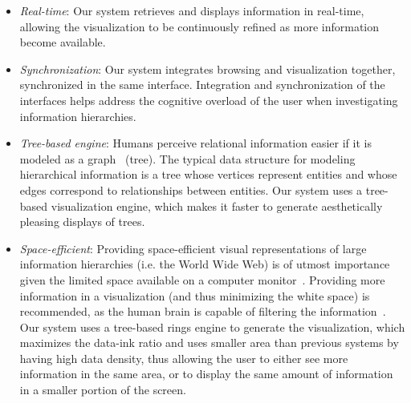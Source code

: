 \documentclass[]{article}
\begin{document}
\begin{itemize}

\item {\em Real-time}: %
Our system retrieves and displays information in real-time, allowing the visualization to be continuously refined as more information become available.

\item {\em Synchronization}: %
Our system integrates browsing and visualization together, synchronized in the same interface.
Integration and synchronization of the interfaces helps address the cognitive overload of the user when investigating information hierarchies.

\item {\em Tree-based engine}: Humans perceive relational information easier if it is modeled as a graph~\cite{dett-gd-99} (tree).
The typical data structure for modeling hierarchical information is a tree whose vertices represent entities and whose edges correspond to relationships between entities.
Our system uses a tree-based visualization engine, which makes it faster to generate aesthetically pleasing displays of trees.

\item {\em Space-efficient}: Providing space-efficient visual representations of large information hierarchies (i.e. the World Wide Web) is of utmost importance given the limited space available on a computer monitor~\cite{rahj04}.
Providing more information in a visualization (and thus minimizing the white space) is recommended, as the human brain is capable of filtering the information~\cite{t-01}.
Our system uses a tree-based rings engine to generate the visualization, which maximizes the data-ink ratio and uses smaller area than previous systems by having high data density, thus allowing the user to either see more information in the same area, or to display the same amount of information in a smaller portion of the screen.


\end{itemize}
\end{document}
